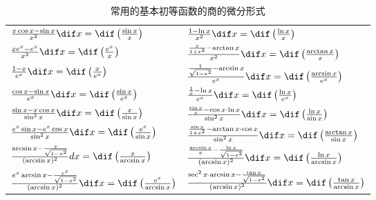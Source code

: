 \documentclass[color=green,titlestyle=hang]{elegantbook}%
\begin{document}
\newpage
\begin{table}[htbp]
\centering
\caption{常用的基本初等函数的商的微分形式}
\begin{tabularx}{\textwidth}{Xl}
\toprule
$\frac{x\cos x-\sin x}{x^{2}}\dif x=\dif\left(\frac{\sin x}{x}\right)$ & $\frac{1-\ln x}{x^{2}}\dif x=\dif\left(\frac{\ln x}{x}\right)$ \\[3mm]
$\frac{x e^{x}-e^{x}}{x^{2}}\dif x=\dif\left(\frac{e^{x}}{x}\right)$ & $\frac{\frac{x}{1+x^{2}}-\arctan x}{x^{2}}\dif x=\dif\left(\frac{\arctan x}{x}\right)$ \\[3mm]
$\frac{1-x}{e^{x}}\dif x=\dif\left(\frac{x}{e^{x}}\right)$ & $\frac{\frac{1}{\sqrt{1-x^{2}}}-\arcsin x}{e^{x}}\dif x=\dif\left(\frac{\arcsin x}{e^{x}}\right)$ \\[3mm]
$\frac{\cos x-\sin x}{e^{x}}\dif x=\dif\left(\frac{\sin x}{e^{x}}\right)$ & $\frac{\frac{1}{x}-\ln x}{e^{x}}\dif x=\dif\left(\frac{\ln x}{e^{x}}\right)$  \\[3mm]
$\frac{\sin x-x \cos x}{\sin ^{2} x}\dif x=\dif\left(\frac{x}{\sin x}\right)$ & $\frac{\frac{\sin x}{x}-\cos x \cdot \ln x}{\sin ^{2} x} \dif x=\dif\left(\frac{\ln x}{\sin x}\right)$ \\[3mm]
$\frac{e^{x} \sin x-e^{x} \cos x}{\sin ^{2} x}\dif x=\dif\left(\frac{e^{x}}{\sin x}\right)$ & $\frac{\frac{\sin x}{1+x^{2}}-\arctan x \cdot \cos x}{\sin ^{2} x}\dif x=\dif\left(\frac{\arctan x}{\sin x}\right)$ \\[3mm]
$\frac{\arcsin x-\frac{x}{\sqrt{1-x^{2}}}}{(\arcsin x)^{2}} d x=\dif\left(\frac{x}{\arcsin x}\right)$ & $\frac{\frac{\arcsin x}{x}-\frac{\ln x}{\sqrt{1-x^{2}}}}{(\arcsin x)^{2}}\dif x=\dif\left(\frac{\ln x}{\arcsin x}\right)$ \\[3mm]
$\frac{e^{x}\arcsin x-\frac{e^{x}}{\sqrt{1-x^{2}}}}{(\arcsin x)^{2}}\dif x=\dif\left(\frac{e^{x}}{\arcsin x}\right)$& $\frac{\sec ^{2}x\cdot\arcsin x-\frac{\tan x}{\sqrt{1-x^{2}}}}{(\arcsin x)^{2}}\dif x=\dif\left(\frac{\tan x}{\arcsin x}\right)$ \\
\bottomrule				
\end{tabularx}	
\end{table}
\end{document}
